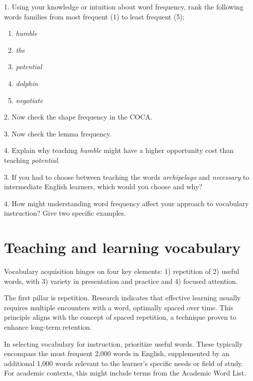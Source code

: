 \begin{tcolorbox}[title=Exercise: Word Frequency and Vocabulary Selection, colback=white, colframe=red!75!black, fonttitle=\bfseries]
1. Using your knowledge or intuition about word frequency, rank the following words families from most frequent (1) to least frequent (5):

\begin{enumerate}
    \item \textit{humble}
    \item \textit{the}
    \item \textit{potential}
    \item \textit{dolphin}
    \item \textit{negotiate}
\end{enumerate}

2. Now check the shape frequency in the COCA.

3. Now check the lemma frequency.

4. Explain why teaching \textit{humble} might have a higher opportunity cost than teaching \textit{potential}.

3. If you had to choose between teaching the words \textit{archipelago} and \textit{necessary} to intermediate English learners, which would you choose and why?

4. How might understanding word frequency affect your approach to vocabulary instruction? Give two specific examples.
\end{tcolorbox}

\section{Teaching and learning vocabulary} \label{sec:teaching-learning-vocab}
Vocabulary acquisition hinges on four key elements: 1) repetition of 2) useful words, with 3) variety in presentation and practice and 4) focused attention. 

The first pillar is repetition. Research indicates that effective learning usually requires multiple encounters with a word, optimally spaced over time. This principle aligns with the concept of spaced repetition, a technique proven to enhance long-term retention.

In selecting vocabulary for instruction, prioritize useful words. These typically encompass the most frequent 2,000 words in English, supplemented by an additional 1,000 words relevant to the learner's specific needs or field of study. For academic contexts, this might include terms from the Academic Word List.

